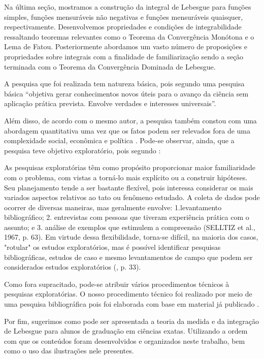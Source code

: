   	Na última seção, mostramos a construção da integral de Lebesgue para funções simples, funções mensuráveis não negativas e funções mensuráveis quaisquer, respectivamente.
  	Desenvolvemos propriedades e condições de integrabilidade ressaltando teoremas relevantes como o Teorema da Convergência Monótona e o Lema de Fatou.
  	Posteriormente abordamos um vasto número de proposições e propriedades sobre integrais com a finalidade de familiarização sendo a seção terminada com o Teorema da Convergência Dominada de Lebesgue.
  	
  
  	
  	A pesquisa que foi realizada tem natureza básica, pois segundo \cite[p. 51]{profreitas} uma pesquisa básica
  	\enquote{objetiva gerar conhecimentos novos úteis para o avanço da ciência sem aplicação prática prevista. Envolve verdades e interesses universais}. 
  	
  	Além disso, de acordo com o mesmo autor, a pesquisa também constou com uma abordagem quantitativa uma vez que os fatos podem ser relevados fora de uma complexidade social, econômica e política \cite{profreitas}. 
  	Pode-se observar, ainda, que a pesquisa teve objetivo exploratório, pois segundo \citeauthor{gil}:
  	
  	\begin{citlon}
  		As pesquisas exploratórias têm como propósito proporcionar maior familiaridade com o problema, com vistas a torná-lo mais explícito ou a construir hipóteses. 
  		Seu planejamento tende a ser bastante flexível, pois interessa considerar os mais variados aspectos relativos ao tato ou fenômeno estudado.
  		A coleta de dados pode ocorrer de diversas maneiras, mas geralmente envolve: 1.levantamento bibliográfico;
  		2. entrevistas com pessoas que tiveram experiência prática com o assunto; 
  		e 3. análise de exemplos que estimulem a compreensão (SELLTIZ et al., 1967, p. 63). 
  		Em virtude dessa flexibilidade, torna-se difícil, na maioria dos casos, "rotular" os estudos exploratórios, mas é possível identificar pesquisas bibliográficas, estudos de caso e mesmo levantamentos de campo que podem ser considerados estudos exploratórios (\citeyear{gil}, p. 33).
  	\end{citlon}
  	
  	Como fora supracitado, pode-se atribuir vários procedimentos técnicos à pesquisas exploratórias. 
  	O nosso procedimento técnico foi realizado por meio de uma pesquisa bibliográfica pois foi elaborada com base em material já publicado \cite{gil}.
  	
  	Por fim, sugerimos como pode ser apresentada a teoria da medida e da integração de Lebesgue para alunos de graduação em ciências exatas.
  	Utilizando a ordem com que os conteúdos foram desenvolvidos e organizados neste trabalho, bem como o uso das ilustrações nele presentes.
    
    
    
    
    
    
    
    
    
    
    
    
    
    
    
    
    
    